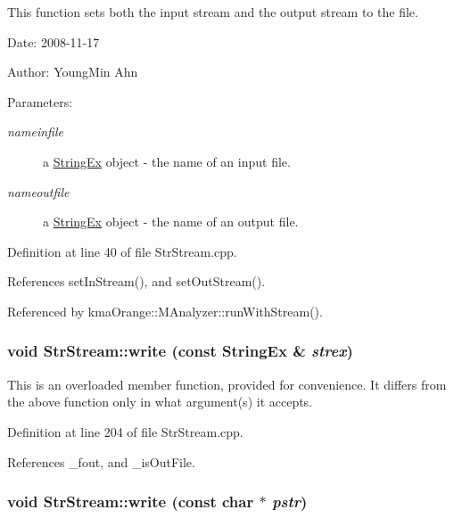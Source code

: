 This function sets both the input stream and the output stream to the file. 

\begin{Desc}
\item[Date:]2008-11-17 \end{Desc}
\begin{Desc}
\item[Author:]YoungMin Ahn \end{Desc}
\begin{Desc}
\item[Parameters:]
\begin{description}
\item[{\em nameinfile}]a \hyperlink{classStringEx}{StringEx} object - the name of an input file. \item[{\em nameoutfile}]a \hyperlink{classStringEx}{StringEx} object - the name of an output file. \end{description}
\end{Desc}


Definition at line 40 of file StrStream.cpp.

References setInStream(), and setOutStream().

Referenced by kmaOrange::MAnalyzer::runWithStream().\hypertarget{classkmaOrange_1_1StrStream_c466e1f8494ee24b4cfe7e24ef20682e}{
\subsubsection[{write}]{\setlength{\rightskip}{0pt plus 5cm}void StrStream::write (const {\bf StringEx} \& {\em strex})}}
\label{classkmaOrange_1_1StrStream_c466e1f8494ee24b4cfe7e24ef20682e}


This is an overloaded member function, provided for convenience. It differs from the above function only in what argument(s) it accepts. 

Definition at line 204 of file StrStream.cpp.

References \_\-fout, and \_\-isOutFile.\hypertarget{classkmaOrange_1_1StrStream_0edd64d2f685a6009bf551b3599cb151}{
\subsubsection[{write}]{\setlength{\rightskip}{0pt plus 5cm}void StrStream::write (const char $\ast$ {\em pstr})}}
\label{classkmaOrange_1_1StrStream_0edd64d2f685a6009bf551b3599cb151}



